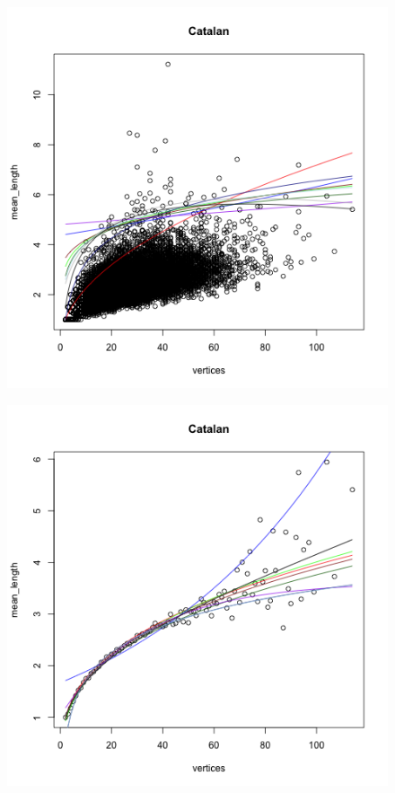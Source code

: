 \documentclass[paper=a4, fontsize=11pt]{scrartcl} %
\begin{document}
\begin{figure}
\begin{minipage}{\textwidth}
\begin{minipage}{.5\textwidth}
  \includegraphics[width=\linewidth]{Mean_Catalan2}
  \label{fig:cat2}
\end{minipage}
\centering
\begin{minipage}{.5\textwidth}
  \centering
  \includegraphics[width=\linewidth]{Mean_Catalan3}

\end{minipage}
\end{minipage}
\end{figure}
\end{document}
